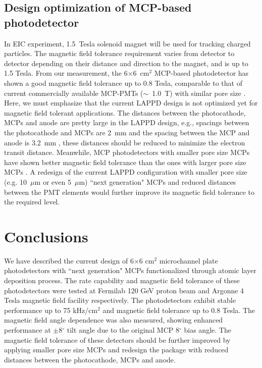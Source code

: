 \documentclass[preprint,5p]{elsarticle}
\begin{document}
\subsection{Design optimization of MCP-based photodetector}\label{subsec_opt}
In EIC experiment, 1.5~Tesla solenoid magnet will be used for tracking charged 
particles. The magnetic field tolerance requirement varies from detector to 
detector depending on their distance and direction to the magnet, and is up to 
1.5 Tesla. From our measurement, the 6$\times$6~cm$^2$ MCP-based photodetector 
has shown a good magnetic field tolerance up to 0.8 Tesla, comparable to that 
of current commercially available MCP-PMTs ($\sim$~1.0~T) with similar pore 
size \cite{MCPs-B}. Here, we must emphasize that the current LAPPD design is 
not optimized yet for magnetic field tolerant applications. The distances 
between the photocathode, MCPs and anode are pretty large in the LAPPD design, 
e.g., spacings between the photocathode and MCPs are 2~mm and the spacing 
between the MCP and anode is 3.2~mm \cite{Wang-MCPs}, these distances should be 
reduced to minimize the electron transit distance. Meanwhile, MCP 
photodetectors with smaller pore size MCPs have shown better magnetic field 
tolerance than the ones with larger pore size MCPs \cite{MCPs-B, Lehmann, 
Ilieva}. A redesign of the current LAPPD configuration with smaller pore size 
(e.g. 10~$\mu$m or even 5~$\mu$m) ``next generation" MCPs and reduced distances 
between the PMT elements would further improve its magnetic field tolerance to 
the required level. 

\section{Conclusions}
We have described the current design of 6$\times$6 cm$^2$ microchannel plate 
photodetectors with ``next generation" MCPs functionalized through atomic layer 
deposition process. The rate capability and magnetic field tolerance of these 
photodetectors were tested at Fermilab 120 GeV proton beam and Argonne 4 Tesla 
magnetic field facility respectively. The photodetectors exhibit stable 
performance up to 75 kHz/cm$^2$ and magnetic field tolerance up to 0.8 Tesla.  
The magnetic field angle dependence was also measured, showing enhanced 
performance at $\pm$8$^{\circ}$ tilt angle due to the original MCP 8$^{\circ}$ 
bias angle. The magnetic field tolerance of these detectors should be further 
improved by applying smaller pore size MCPs and redesign the package with 
reduced distances between the photocathode, MCPs and anode.
 
\end{document}
